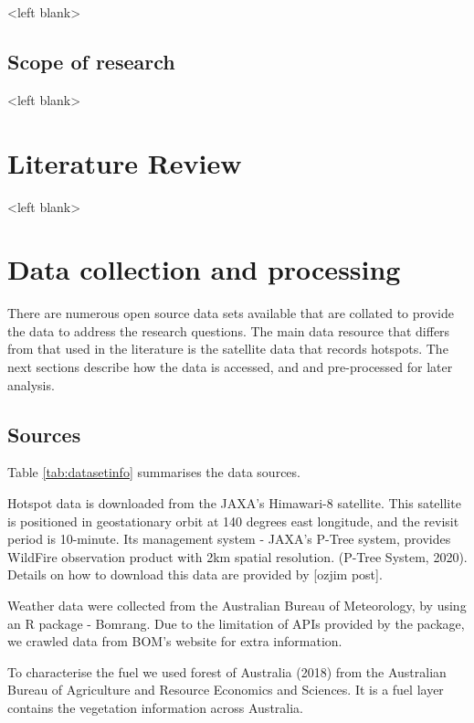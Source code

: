 \documentclass{monashthesis}
\begin{document}
\textless left blank\textgreater{}

\hypertarget{scope-of-research}{%
\section{Scope of research}\label{scope-of-research}}

\textless left blank\textgreater{}

\hypertarget{literature-review}{%
\chapter{Literature Review}\label{literature-review}}

\textless left blank\textgreater{}

\hypertarget{data-collection-and-processing}{%
\chapter{Data collection and processing}\label{data-collection-and-processing}}

There are numerous open source data sets available that are collated to provide the data to address the research questions. The main data resource that differs from that used in the literature is the satellite data that records hotspots. The next sections describe how the data is accessed, and and pre-processed for later analysis.

\hypertarget{sources}{%
\section{Sources}\label{sources}}

Table \ref{tab:datasetinfo} summarises the data sources.

Hotspot data is downloaded from the JAXA's Himawari-8 satellite. This satellite is positioned in geostationary orbit at 140 degrees east longitude, and the revisit period is 10-minute. Its management system - JAXA's P-Tree system, provides WildFire observation product with 2km spatial resolution. (P-Tree System, 2020). Details on how to download this data are provided by {[}ozjim post{]}.

Weather data were collected from the Australian Bureau of Meteorology, by using an R package - Bomrang. Due to the limitation of APIs provided by the package, we crawled data from BOM's website for extra information.

To characterise the fuel we used forest of Australia (2018) from the Australian Bureau of Agriculture and Resource Economics and Sciences. It is a fuel layer contains the vegetation information across Australia.
\end{document}
